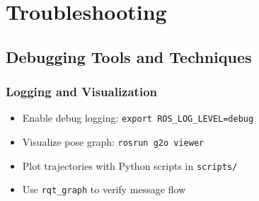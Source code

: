 %
%

\chapter{Troubleshooting}

\section{Debugging Tools and Techniques}

\subsection{Logging and Visualization}
\begin{itemize}
    \item Enable debug logging: \texttt{export ROS\_LOG\_LEVEL=debug}
    \item Visualize pose graph: \texttt{rosrun g2o viewer}
    \item Plot trajectories with Python scripts in \texttt{scripts/}
    \item Use \texttt{rqt\_graph} to verify message flow
\end{itemize}

